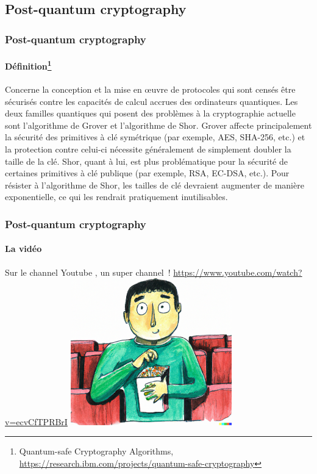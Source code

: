 \documentclass{beamer}
\begin{document}
    \subsection{Post-quantum cryptography}\label{subsec:pqc}
    \begin{frame}
        \frametitle{Post-quantum cryptography}
        \framesubtitle{Définition\footnote{Quantum-safe Cryptography Algorithms, \url{https://research.ibm.com/projects/quantum-safe-cryptography}}}
        \transdissolve
        Concerne la conception et la mise en œuvre de protocoles qui sont censés être sécurisés contre les capacités de calcul accrues des ordinateurs quantiques.
        Les deux familles quantiques qui posent des problèmes à la cryptographie actuelle sont l'algorithme de Grover et l'algorithme de Shor.
        \bigbreak
        Grover affecte principalement la sécurité des primitives à clé symétrique (par exemple, AES, SHA-256, etc.) et la protection contre celui-ci nécessite généralement de simplement doubler la taille de la clé.
        \bigbreak
        Shor, quant à lui, est plus problématique pour la sécurité de certaines primitives à clé publique (par exemple, RSA, EC-DSA, etc.).
        Pour résister à l'algorithme de Shor, les tailles de clé devraient augmenter de manière exponentielle, ce qui les rendrait pratiquement inutilisables.
    \end{frame}

    \begin{frame}
        \frametitle{Post-quantum cryptography}
        \framesubtitle{La vidéo}
        \transdissolve
        Sur le channel Youtube , un super channel~! \url{https://www.youtube.com/watch?v=ecvCfTPRBrI}
        \bigbreak
        \centering
        \includegraphics[width=7cm]{image/man-at-the-cinema-eating pop-corn}
    \end{frame}
\end{document}

